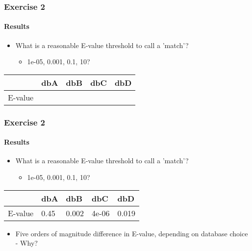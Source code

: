 \begin{frame}
  \frametitle{Exercise 2}
  \framesubtitle{Results}
  \begin{itemize}
    \item What is a reasonable E-value threshold to call a 'match'?
    \begin{itemize}
      \item 1e-05, 0.001, 0.1, 10?
    \end{itemize}
  \end{itemize}
  \begin{center}
  \begin{tabular}{r|l|l|l|l}
            & dbA & dbB & dbC & dbD \\
	  \hline
	  \hline
	  E-value &      &  &  & \\
  \end{tabular}
  \end{center}
\end{frame}

\begin{frame}
  \frametitle{Exercise 2}
  \framesubtitle{Results}
  \begin{itemize}
    \item What is a reasonable E-value threshold to call a 'match'?
    \begin{itemize}
      \item 1e-05, 0.001, 0.1, 10?
    \end{itemize}
  \end{itemize}
  \begin{center}
  \begin{tabular}{r|l|l|l|l}
	   & dbA & dbB & dbC & dbD \\
	  \hline
	  \hline
	  E-value & 0.45 & 0.002 & 4e-06 & 0.019 \\
  \end{tabular}
  \end{center}
  \begin{itemize}
    \item Five orders of magnitude difference in E-value, depending on database choice - Why?
  \end{itemize}    
\end{frame}

